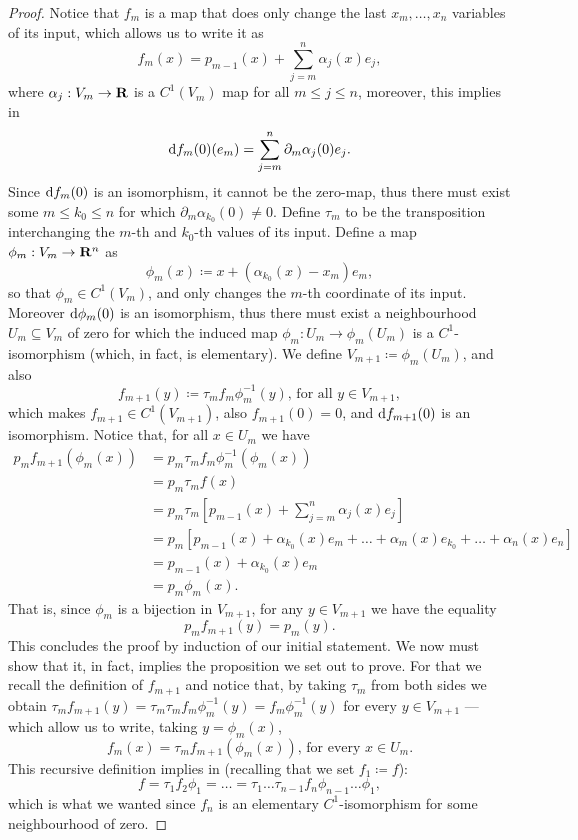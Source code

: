 \begin{proof}
Notice that \(f_m\) is a map that does only change the last \(x_m, \dots,
x_{n}\) variables of its input, which allows us to write it as
\[
  f_{m}(x) = p_{m-1}(x) + \sum_{j=m}^n \alpha_j(x) e_j,
\]
where \(\alpha_j: V_m \to \mathbf{R}\) is a \(C^1(V_m)\) map for all \(m \leq j \leq
n\), moreover, this implies in
\[
  \mathrm{d} f_m(0)(e_m) = \sum_{j = m}^n \partial_{m} \alpha_j(0) e_{j}.
\]
Since \(\mathrm{d} f_{m}(0)\) is an isomorphism, it cannot be the zero-map, thus
there must exist some \(m \leq k_0 \leq n\) for which \(\partial_m
\alpha_{k_0}(0) \neq 0\). Define \(\tau_m\) to be the transposition interchanging
the \(m\)-th and \(k_0\)-th values of its input. Define a map \(\phi_m: V_m \to
\mathbf{R}^n\) as
\[
  \phi_m(x) \coloneq x + (\alpha_{k_0}(x) - x_m) e_m,
\]
so that \(\phi_{m} \in C^1(V_m)\), and only changes the \(m\)-th coordinate of
its input. Moreover \(\mathrm{d} \phi_m(0)\) is an isomorphism, thus there must
exist a neighbourhood \(U_m \subseteq V_m\) of zero for which the induced map
\(\phi_m: U_m \to \phi_m(U_m)\) is a \(C^1\)-isomorphism (which, in fact, is
elementary). We define \(V_{m + 1} \coloneq \phi_m(U_m)\), and also
\[
  f_{m+1}(y) \coloneq \tau_m f_m\phi^{-1}_m(y)\text{, for all } y \in V_{m+1},
\]
which makes \(f_{m+1} \in C^{1}(V_{m+1})\), also \(f_{m+1}(0) = 0\), and \(\mathrm{d}
f_{m+1}(0)\) is an isomorphism. Notice that, for all \(x \in U_m\) we have
\begin{align*}
  p_m f_{m+1}(\phi_m(x))
  &= p_m \tau_m f_m \phi_m^{-1}(\phi_m(x)) \\
  &= p_m \tau_m f(x) \\
  &= p_m \tau_m \left[ p_{m-1}(x) + \sum_{j=m}^n \alpha_j(x) e_j \right] \\
  &= p_{m} \left[
    p_{m-1}(x) + \alpha_{k_0}(x) e_m + \dots
    + \alpha_m(x) e_{k_0} + \dots + \alpha_n(x) e_n
    \right] \\
  &= p_{m-1}(x) + \alpha_{k_0}(x) e_m \\
  &= p_m \phi_m(x).
\end{align*}
That is, since \(\phi_m\) is a bijection in \(V_{m+1}\), for any \(y \in
V_{m+1}\) we have the equality
\[
  p_m f_{m+1}(y) = p_m(y).
\]
This concludes the proof by induction of our initial statement. We now must show
that it, in fact, implies the proposition we set out to prove. For that we
recall the definition of \(f_{m+1}\) and notice that, by taking \(\tau_m\) from
both sides we obtain \(\tau_m f_{m+1}(y) = \tau_{m} \tau_m f_m \phi_m^{-1}(y) =
f_m \phi_m^{-1}(y)\) for every \(y \in V_{m+1}\) --- which allow us to write,
taking \(y = \phi_m(x)\),
\[
  f_m(x) = \tau_m f_{m+1}(\phi_m(x)) \text{, for every } x \in U_m.
\]
This recursive definition implies in (recalling that we set \(f_1 \coloneq f\)):
\[
  f = \tau_1 f_2 \phi_1
  = \dots
  = \tau_1 \dots \tau_{n-1} f_n \phi_{n-1} \dots \phi_{1},
\]
which is what we wanted since \(f_n\) is an elementary \(C^{1}\)-isomorphism for
some neighbourhood of zero.
\end{proof}

